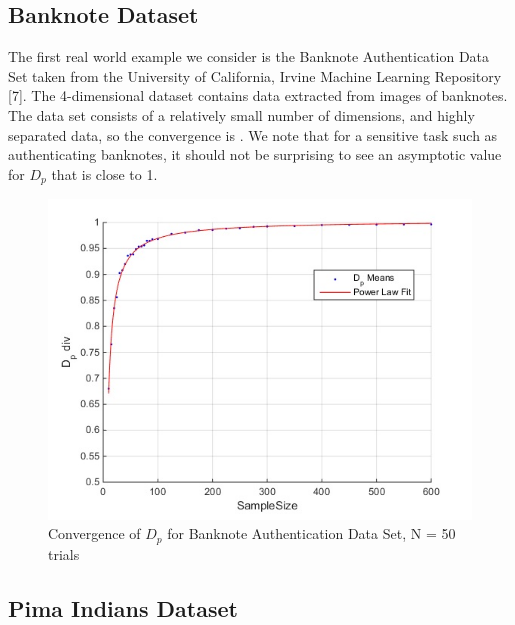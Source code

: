 \documentclass{article}
\begin{document}
	\newpage
	\subsection*{\small Banknote Dataset}
	The first real world example we consider is the Banknote Authentication Data Set taken from the University of California, Irvine Machine Learning Repository [7]. The 4-dimensional dataset contains data extracted from images of banknotes. The data set consists of a relatively small number of dimensions, and highly separated data, so the convergence is . We note that for a sensitive task such as authenticating banknotes, it should not be surprising to see an asymptotic value for $D_p$ that is close to 1.  
	
	\newpage
	\begin{figure}[h!]
		\caption{Convergence of $D_p$ for Banknote Authentication Data Set, N = 50 trials}
		\centering
		\includegraphics[scale=0.6]{dp_n50_banknote}
	\end{figure}
	
	\newpage
	\subsection*{\small Pima Indians Dataset}
	
\end{document}
